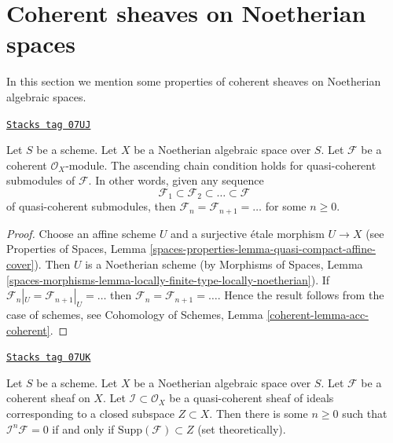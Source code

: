 \section{Coherent sheaves on Noetherian spaces}
\label{spaces-cohomology-section-coherent-quasi-compact}
In this section we mention some properties of coherent sheaves on
Noetherian algebraic spaces.

\begin{lemma}
\label{spaces-cohomology-lemma-acc-coherent}
\href{https://stacks.math.columbia.edu/tag/07UJ}{\texttt{Stacks tag 07UJ}}

Let $S$ be a scheme. Let $X$ be a Noetherian algebraic space over $S$.
Let $\mathcal{F}$ be a coherent $\mathcal{O}_X$-module.
The ascending chain condition holds for quasi-coherent submodules
of $\mathcal{F}$. In other words, given any sequence
$$
\mathcal{F}_1 \subset \mathcal{F}_2 \subset \ldots \subset \mathcal{F}
$$
of quasi-coherent submodules, then
$\mathcal{F}_n = \mathcal{F}_{n + 1} = \ldots $ for some $n \geq 0$.
\end{lemma}

\begin{proof}
Choose an affine scheme $U$ and a surjective \'etale morphism $U \to X$
(see Properties of Spaces, Lemma
\ref{spaces-properties-lemma-quasi-compact-affine-cover}).
Then $U$ is a Noetherian scheme (by
Morphisms of Spaces, Lemma
\ref{spaces-morphisms-lemma-locally-finite-type-locally-noetherian}).
If $\mathcal{F}_n|_U = \mathcal{F}_{n + 1}|_U = \ldots$
then $\mathcal{F}_n = \mathcal{F}_{n + 1} = \ldots$.
Hence the result follows from the case of schemes, see
Cohomology of Schemes, Lemma \ref{coherent-lemma-acc-coherent}.
\end{proof}

\begin{lemma}
\label{spaces-cohomology-lemma-power-ideal-kills-sheaf}
\href{https://stacks.math.columbia.edu/tag/07UK}{\texttt{Stacks tag 07UK}}

Let $S$ be a scheme. Let $X$ be a Noetherian algebraic space over $S$.
Let $\mathcal{F}$ be a coherent sheaf on $X$. Let
$\mathcal{I} \subset \mathcal{O}_X$ be a quasi-coherent sheaf of ideals
corresponding to a closed subspace $Z \subset X$. Then there is some
$n \geq 0$ such that $\mathcal{I}^n\mathcal{F} = 0$ if and only if
$\text{Supp}(\mathcal{F}) \subset Z$ (set theoretically).
\end{lemma}

